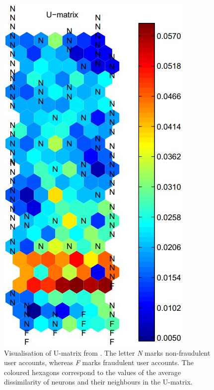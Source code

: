 \begin{figure}[http]
    \begin{center}
      \includegraphics[scale=0.3]{images/SOM_U_Matrix_vis.jpg}
      \caption{Visualisation of U-matrix from \cite{fd_SOM}. The letter \textit{N} marks non-fraudulent user accounts, whereas \textit{F} marks fraudulent user accounts. The coloured hexagons correspond to the values of the average dissimilarity of neurons and their neighbours in the U-matrix.}
      \label{fig:U_Matrix}
    \end{center}
\end{figure}

